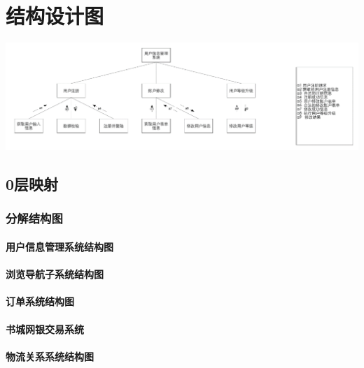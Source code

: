 \chapter{结构设计图}
\includegraphics{ch6-img/0.png}
\section{0层映射}
\subsection{分解结构图}
\subsubsection{用户信息管理系统结构图}
\subsubsection{浏览导航子系统结构图}
\subsubsection{订单系统结构图}
\subsubsection{书城网银交易系统}
\subsubsection{物流关系系统结构图}
